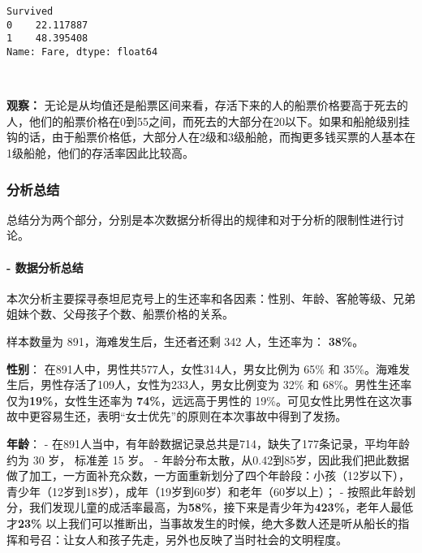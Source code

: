 \documentclass[11pt]{article}
\begin{document}
    \begin{Verbatim}[commandchars=\\\{\}]
Survived
0    22.117887
1    48.395408
Name: Fare, dtype: float64

    \end{Verbatim}

    \begin{center}
    \end{center}
    { \hspace*{\fill} \\}
    
    \textbf{观察：}
无论是从均值还是船票区间来看，存活下来的人的船票价格要高于死去的人，他们的船票价格在0到55之间，而死去的大部分在20以下。如果和船舱级别挂钩的话，由于船票价格低，大部分人在2级和3级船舱，而掏更多钱买票的人基本在1级船舱，他们的存活率因此比较高。

    \subsubsection{分析总结}\label{ux5206ux6790ux603bux7ed3}

总结分为两个部分，分别是本次数据分析得出的规律和对于分析的限制性进行讨论。

\paragraph{- 数据分析总结}\label{ux6570ux636eux5206ux6790ux603bux7ed3}

本次分析主要探寻泰坦尼克号上的生还率和各因素：性别、年龄、客舱等级、兄弟姐妹个数、父母孩子个数、船票价格的关系。

样本数量为 891，海难发生后，生还者还剩 342 人，生还率为：
\textbf{38\%}。

\textbf{性别}： 在891人中，男性共577人，女性314人，男女比例为 65\% 和
35\%。海难发生后，男性存活了109人，女性为233人，男女比例变为 32\% 和
68\%。男性生还率仅为\textbf{19\%}，女性生还率为
\textbf{74\%}，远远高于男性的
19\%。可见女性比男性在这次事故中更容易生还，表明``女士优先''的原则在本次事故中得到了发扬。

\textbf{年龄}： -
在891人当中，有年龄数据记录总共是714，缺失了177条记录，平均年龄约为 30
岁， 标准差 15 岁。 -
年龄分布太散，从0.42到85岁，因此我们把此数据做了加工，一方面补充众数，一方面重新划分了四个年龄段：小孩（12岁以下），青少年（12岁到18岁），成年（19岁到60岁）和老年（60岁以上）；
-
按照此年龄划分，我们发现儿童的成活率最高，为\textbf{58\%}，接下来是青少年为\textbf{423\%}，老年人最低才\textbf{23\%}
以上我们可以推断出，当事故发生的时候，绝大多数人还是听从船长的指挥和号召：让女人和孩子先走，另外也反映了当时社会的文明程度。
\end{document}
